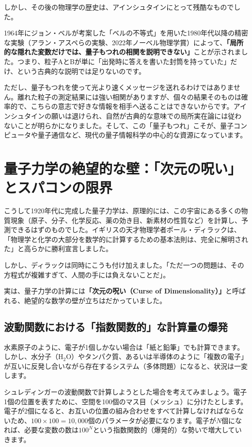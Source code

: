 しかし、その後の物理学の歴史は、アインシュタインにとって残酷なものでした。

1964年にジョン・ベルが考案した「ベルの不等式」を用いた1980年代以降の精密な実験（アラン・アスペらの実験、2022年ノーベル物理学賞）によって、\textbf{「局所的な隠れた変数だけでは、量子もつれの相関を説明できない」}ことが示されました。つまり、粒子AとBが単に「出発時に答えを書いた封筒を持っていた」だけ、という古典的な説明では足りないのです。

ただし、量子もつれを使って光より速くメッセージを送れるわけではありません。離れた粒子の測定結果には強い相関がありますが、個々の結果そのものは確率的で、こちらの意志で好きな情報を相手へ送ることはできないからです。アインシュタインの願いは退けられ、自然が古典的な意味での局所実在論には従わないことが明らかになりました。そして、この「量子もつれ」こそが、量子コンピュータや量子通信など、現代の量子情報科学の中心的な資源になっています。

\section{量子力学の絶望的な壁：「次元の呪い」とスパコンの限界}

こうして1920年代に完成した量子力学は、原理的には、この宇宙にある多くの物質現象（原子、分子、化学反応、薬の効き目、新素材の性質など）を計算し、予測できるはずのものでした。イギリスの天才物理学者ポール・ディラックは、「物理学と化学の大部分を数学的に計算するための基本法則は、完全に解明された」と高らかに勝利宣言しました。

しかし、ディラックは同時にこうも付け加えました。「ただ一つの問題は、その方程式が複雑すぎて、人間の手には負えないことだ」。

実は、量子力学の計算には\textbf{「次元の呪い（Curse of Dimensionality）」}と呼ばれる、絶望的な数学の壁が立ちはだかっていました。

\subsection{波動関数における「指数関数的」な計算量の爆発}

水素原子のように、電子が1個しかない場合は「紙と鉛筆」でも計算できます。しかし、水分子（H\(_2\)O）やタンパク質、あるいは半導体のように「複数の電子」が互いに反発し合いながら存在するシステム（多体問題）になると、状況は一変します。

シュレディンガーの波動関数で計算しようとした場合を考えてみましょう。電子1個の位置を表すために、空間を100個のマス目（メッシュ）に分けたとします。電子が2個になると、お互いの位置の組み合わせをすべて計算しなければならないため、\(100 \times 100 = 10,000\)個のパラメータが必要になります。電子が\(N\)個になれば、必要な変数の数は\(100^N\)という指数関数的（爆発的）な勢いで増大していきます。

